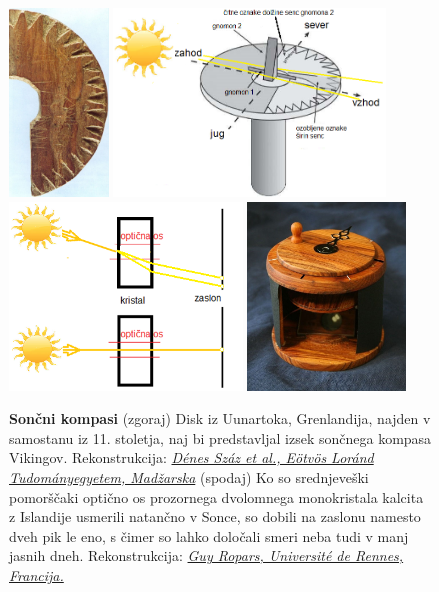 \begin{figure}
	\centering
	\includegraphics[height=5cm]{Predavanja/01_Uvod/figs/Sun_Compass_d.jpg}
	\hspace*{1.0cm}
	\includegraphics[height=5cm]{Predavanja/01_Uvod/figs/RekonstrukcijaVikingSunCompass_s.png}\\
	\vspace*{0.25cm}
	\includegraphics[height=5cm]{Predavanja/01_Uvod/figs/Kristal-SonceVInIzOPticneOsi_.png}
	\includegraphics[height=5cm]{Predavanja/01_Uvod/figs/VikingSunstoneCompass.jpg}
	\caption{\textbf{Sončni kompasi} (zgoraj) Disk iz Uunartoka, Grenlandija, najden v samostanu iz 11. stoletja, naj bi predstavljal izsek sončnega kompasa Vikingov. Rekonstrukcija: \href{DOI: 10.1098/rspa.2016.0171}{\textit{Dénes Száz et al., Eötvös Loránd Tudományegyetem, Madžarska}} (spodaj) Ko so srednjeveški pomorščaki optično os prozornega dvolomnega monokristala kalcita z Islandije usmerili natančno v Sonce, so dobili na zaslonu namesto dveh pik le eno, s čimer so lahko določali smeri neba tudi v manj jasnih dneh. Rekonstrukcija: \href{http://www.livescience.com/16831-viking-sunstone-crystal-compass.html}{\textit{Guy Ropars, Université de Rennes, Francija.}}}

\end{figure}
